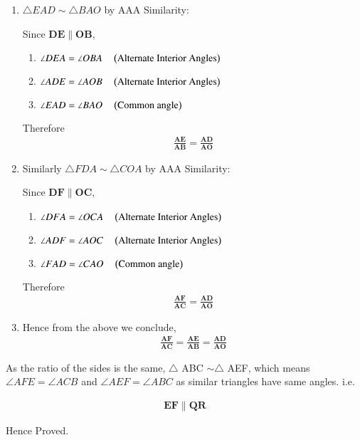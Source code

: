 \renewcommand{\vec}[1]{\mathbf{#1}}
 \renewcommand{\theequation}{\theenumi}
\begin{enumerate}[label=\thesection.\arabic*.,ref=\thesection.\theenumi]

 \item
 $\triangle EAD \sim \triangle BAO$ by AAA Similarity:

Since $\vec{DE} \parallel \vec{OB}$,
\begin{enumerate}
	\item $\angle{DEA} = \angle{OBA} \quad \left(\text{Alternate Interior Angles}\right)$
	\item $\angle{ADE} = \angle{AOB} \quad \left(\text{Alternate Interior Angles}\right)$
	  
	\item $\angle{EAD} = \angle{BAO} \quad \left(\text{Common angle}\right) $
	
\end{enumerate}

Therefore 
\begin{align}
\vec{\frac{AE}{AB}} = \vec{\frac{AD}{AO}}
\end{align}

\item
Similarly 
$\triangle FDA \sim \triangle COA$ by AAA Similarity:

Since $\vec{DF} \parallel \vec{OC}$,
\begin{enumerate}
	\item $\angle{DFA} = \angle{OCA} \quad \left(\text{Alternate Interior Angles}\right)$
	\item $\angle{ADF} = \angle{AOC} \quad \left(\text{Alternate Interior Angles}\right)$
	  
	\item $\angle{FAD} = \angle{CAO} \quad \left(\text{Common angle}\right) $
	
\end{enumerate}


Therefore 
\begin{align}
\vec{\frac{AF}{AC}} = \vec{\frac{AD}{AO}}
\end{align}


\item
Hence from the above we conclude,
\begin{align}
\vec{\frac{AF}{AC}} = \vec{\frac{AE}{AB}} = \vec{\frac{AD}{AO}}
\end{align}
\end{enumerate}
As the ratio of the sides is the same, $\triangle$ ABC $\sim \triangle$ AEF, which means $\angle{AFE} = \angle{ACB}$ and $\angle{AEF} = \angle{ABC}$ as similar triangles have same angles.
i.e. 

\begin{align}
\vec{EF} \parallel \vec{QR}
\end{align}
\begin{centering}
Hence Proved.
\end{centering}
